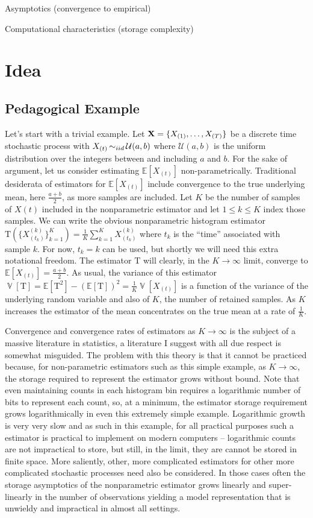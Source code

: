 \documentclass{article} %
\newcommand{\estimator}{\mbox{T}}
\newcommand{\X}{{\bf X}}
\newcommand{\drawn}{\operatornamewithlimits{\sim}}
\DeclareMathOperator*{\VarSym}{\mathbb{V}}
\newcommand{\Var}[1]{\ensuremath{\VarSym[#1]}}
\newcommand{\E}[1]{\ensuremath{\mathbb{E}[#1]}}
\begin{document}
Asymptotics (convergence to empirical)

Computational characteristics (storage complexity)
\section{Idea}

\subsection{Pedagogical Example}

Let's start with a trivial example.  Let $\X = \{X_{(1)}, \ldots, X_{(T)}\}$ be a discrete time stochastic process with $X_{(t)} \drawn_{iid} \mathcal{U}(a,b)$ where $\mathcal{U}(a,b)$ is the uniform distribution over the integers between and including $a$ and $b$.  For the sake of argument, let us consider estimating $\E{X_{(t)}}$ non-parametrically.  Traditional desiderata of estimators for $\mathbb{E}[X_{(t)}]$ include convergence to the true underlying mean, here $\frac{a+b}{2}$, as more samples are included.  Let $K$ be the number of samples of $X(t)$ included in the nonparametric estimator and let $1 \leq k \leq K$ index those samples.  We can write the obvious nonparametric histogram estimator  $\estimator(\{X^{(k)}_{(t_k)}\}_{k=1}^K) = \frac{1}{K} \sum_{k=1}^{K} X^{(k)}_{(t_k)}$ where $t_k$ is the ``time'' associated with sample $k$.  For now, $t_k=k$ can be used, but shortly we will need this extra notational freedom.  The estimator $\estimator$ will clearly, in the  $K \rightarrow \infty$ limit, converge to $\E{X_{(t)}} = \frac{a+b}{2}$.  As usual, the variance of this estimator $\Var{\estimator} = \E{\estimator^2} - (\E{\estimator})^2 = \frac{1}{K}\Var{X_{(t)}}$ is a function of the variance of the underlying random variable and also of $K$, the number of retained samples.   As $K$ increases the estimator of the mean concentrates on the true mean at a rate of $\frac{1}{K}$.

Convergence and convergence rates of estimators as $K\rightarrow\infty$ is the subject of a massive literature in statistics, a literature I suggest with all due respect is somewhat misguided.  The problem with this theory is that it cannot be practiced because, for non-parametric estimators such as this simple example, as $K\rightarrow\infty$, the storage required to represent the estimator grows without bound.  Note that even maintaining counts in each histogram bin requires a logarithmic number of bits to represent each count, so, at a minimum, the estimator storage requirement grows logarithmically in even this extremely simple example.  Logarithmic growth is very very slow and as such in this example, for all practical purposes such a estimator is practical to implement on modern computers -- logarithmic counts are not impractical to store, but still, in the limit, they are cannot be stored in finite space.  More saliently, other, more complicated estimators for other more complicated stochastic processes need also be considered.  In those cases often the storage asymptotics of the nonparametric estimator grows linearly and super-linearly in the number of observations yielding a model representation that is unwieldy and impractical in almost all settings.
\end{document}
